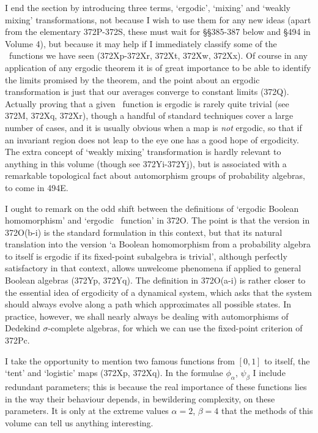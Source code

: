 {I end the section by introducing three terms, `ergodic', `mixing'
and `weakly mixing'
transformations, not because I wish to use them for any new ideas (apart
from the elementary 372P-372S, %
these must wait for \S\S385-387 %
below and \S494 in Volume 4), %
but because
it may help if I immediately classify some of the \imp\ functions we
have seen (372Xp-372Xr, %
372Xt, 372Xw, 372Xx).
Of course in any application of any ergodic theorem it
is of great importance to be able to identify the limits promised by the
theorem, and the point about an ergodic transformation is just that our
averages converge to constant limits (372Q).   Actually proving that a
given \imp\ function is ergodic is rarely quite trivial (see 372M,
372Xq, 372Xr), though a handful of standard techniques cover a large
number of cases, and it is usually obvious when a map is {\it not}
ergodic, so that if an invariant region does not leap to the eye one has
a good hope of ergodicity.   The extra concept of `weakly mixing'
transformation is hardly relevant to anything in this volume (though see
372Yi-372Yj), but
is associated with a remarkable topological fact about automorphism groups
of probability algebras, to come in 494E.

I ought to remark on the odd shift between the definitions of `ergodic
Boolean homomorphism' and `ergodic \imp\ function' in 372O.   The point is
that the version in 372O(b-i) is the standard formulation in this context,
but that its natural translation into the version `a Boolean homomorphism
from a probability algebra to itself is ergodic if its fixed-point
subalgebra is trivial', although perfectly satisfactory in that context,
allows unwelcome phenomena if applied to general Boolean algebras
(372Yp, 372Yq).   The definition in 372O(a-i) is
rather closer to the essential idea
of ergodicity of a dynamical system, which asks that the system should
always evolve along a path which approximates all possible states.
In practice, however,
we shall nearly always be dealing with automorphisms of
Dedekind $\sigma$-complete algebras, for which we can use the
fixed-point criterion of 372Pc.

I take the opportunity to mention two famous functions from $[0,1]$ to
itself, the `tent' and `logistic' maps (372Xp, 372Xq).   In the
formulae $\phi_{\alpha}$, $\psi_{\beta}$ I include redundant parameters;
this is because the real importance of these functions lies in the way
their behaviour depends, in bewildering complexity, on these parameters.
It is only at the extreme values $\alpha=2$, $\beta=4$ that the methods
of this volume can tell us anything interesting.
}%

\discrpage

